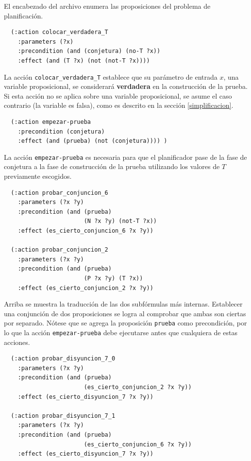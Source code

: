 El encabezado del archivo enumera las proposiciones del problema de
planificación.

\begin{verbatim}
  (:action colocar_verdadera_T
    :parameters (?x)
    :precondition (and (conjetura) (no-T ?x))
    :effect (and (T ?x) (not (not-T ?x))))
\end{verbatim}

La acción \texttt{colocar\_verdadera\_T} establece que su parámetro de entrada
$x$, una variable proposicional, se considerará \textbf{verdadera} en la
construcción de la prueba. Si esta acción no se aplica sobre una variable
proposicional, se asume el caso contrario (la variable es falsa), como es
descrito en la sección \ref{simplificacion}.

\begin{verbatim}
  (:action empezar-prueba
    :precondition (conjetura)
    :effect (and (prueba) (not (conjetura)))) )
 \end{verbatim}

La acción \texttt{empezar-prueba} es necesaria para que el planificador pase de la fase
de conjetura a la fase de construcción de la prueba utilizando los valores de
$T$ previamente escogidos.

\begin{verbatim}
  (:action probar_conjuncion_6
    :parameters (?x ?y)
    :precondition (and (prueba)
                       (N ?x ?y) (not-T ?x))
    :effect (es_cierto_conjuncion_6 ?x ?y))

  (:action probar_conjuncion_2
    :parameters (?x ?y)
    :precondition (and (prueba)
                       (P ?x ?y) (T ?x))
    :effect (es_cierto_conjuncion_2 ?x ?y))
\end{verbatim}

Arriba se muestra la traducción de las dos subfórmulas más internas. Establecer
una conjunción de dos proposiciones se logra al comprobar que ambas son ciertas
por separado. Nótese que se agrega la proposición \texttt{prueba} como
precondición, por lo que la acción \texttt{empezar-prueba} debe ejecutarse
antes que cualquiera de estas acciones.

\begin{verbatim}
  (:action probar_disyuncion_7_0
    :parameters (?x ?y)
    :precondition (and (prueba)
                       (es_cierto_conjuncion_2 ?x ?y))
    :effect (es_cierto_disyuncion_7 ?x ?y))

  (:action probar_disyuncion_7_1
    :parameters (?x ?y)
    :precondition (and (prueba)
                       (es_cierto_conjuncion_6 ?x ?y))
    :effect (es_cierto_disyuncion_7 ?x ?y))
\end{verbatim}

